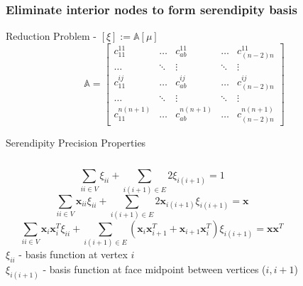 \documentclass[compress,10pt]{beamer}
\renewcommand{\vec}[1]{\mathbf{#1}}
\begin{document}
\begin{frame}[t]\frametitle{Eliminate interior nodes to form serendipity basis}
\begin{block}{Reduction Problem - $\left[ \xi \right] := \mathbb{A}  \left[ \mu \right]$}{\small
\begin{equation*}
\mathbb{A} = 
\left[
\begin{array}{ccccc}
c_{11}^{11} & \ldots & c_{ab}^{11} & \ldots & c_{(n-2)n}^{11} \\
\ldots&\ddots&\vdots&\ddots&\vdots \\
c_{11}^{ij} & \ldots & c_{ab}^{ij} & \ldots & c_{(n-2)n}^{ij} \\
\ldots&\ddots&\vdots&\ddots&\vdots \\
c_{11}^{n(n+1)} & \ldots & c_{ab}^{n(n+1)} & \ldots & c_{(n-2)n}^{n(n+1)} 
\end{array}
\right]
\end{equation*}
}\end{block}
\begin{block}{Serendipity Precision Properties}{\small
\begin{columns}
\begin{equation*}
\sum_{ii \in V} \xi_{ii} + \sum_{i(i+1) \in E} 2 \xi_{i(i+1)} = 1
\end{equation*}
\begin{equation*}
\sum_{ii \in V} \vec{x}_{ii} \xi_{ii} + \sum_{i(i+1) \in E} 2 \vec{x}_{i(i+1)} \xi_{i(i+1)} = \vec{x}
\end{equation*}
\begin{equation*}
\sum_{ii \in V} \vec{x}_{i} \vec{x}_{i}^T \xi_{ii} + \sum_{i(i+1) \in E} \left(  \vec{x}_{i} \vec{x}_{i+1}^T + \vec{x}_{i+1} \vec{x}_{i}^T  \right) \xi_{i(i+1)} = \vec{x} \vec{x}^{T}
\end{equation*}
$\xi_{ii}$ - basis function at vertex $i$\\ \vspace{1mm}
$\xi_{i(i+1)}$ - basis function at face midpoint between vertices ($i, i+1$)
\end{columns}
}\end{block}
\end{frame}
\end{document}
